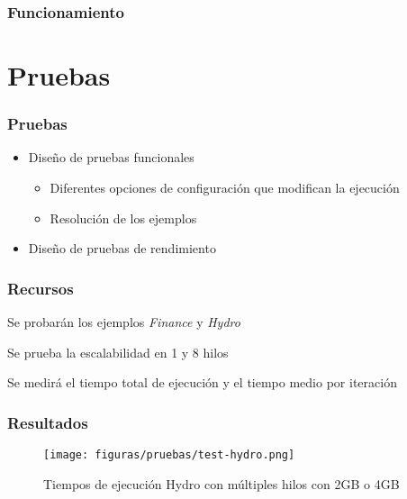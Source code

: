 \documentclass{beamer}
\begin{document}
\begin{frame}{}
    \frametitle{Funcionamiento}
\end{frame}

\section{Pruebas}

\begin{frame}{}
    \frametitle{Pruebas}
    \begin{itemize}
        \item Diseño de pruebas funcionales
        \begin{itemize}
            \item Diferentes opciones de configuración que modifican la ejecución
            \item Resolución de los ejemplos
        \end{itemize}
        \item Diseño de pruebas de rendimiento
    \end{itemize}
\end{frame}

\begin{frame}{}
    \frametitle{Recursos}
    \item Se probarán los ejemplos \textit{Finance} y \textit{Hydro}
    \item Se prueba la escalabilidad en 1 y 8 hilos
    \item Se medirá el tiempo total de ejecución y el tiempo medio por iteración
\end{frame}

\begin{frame}[plain]
    \frametitle{Resultados}
    \begin{figure}[H]
        \centerline{\texttt{[image: figuras/pruebas/test-hydro.png]}}
        \caption{Tiempos de ejecución Hydro con múltiples hilos con 2GB o 4GB}
        \label{fig:test-hydro}
    \end{figure}
\end{frame}
\end{document}
